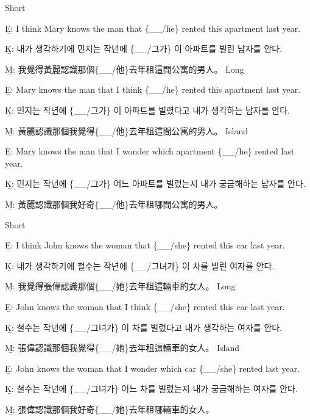 \pex %
\a Short\par\nobreak
\beginsubsub
\b{E:} I think Mary knows the man that \{\_\_/he\} rented this apartment last year.\par\nobreak
\b{K:} \ko 내가 생각하기에 민지는 작년에 \{\_\_/그가\} 이 아파트를 빌린 남자를 안다. \normalfont\par\nobreak
\b{M:} \zh 我覺得黃麗認識那個\{\_\_/他\}去年租這間公寓的男人。 \normalfont
\endsubsub
\a Long\par\nobreak
\beginsubsub
\b{E:} Mary knows the man that I think \{\_\_/he\} rented this apartment last year.\par\nobreak
\b{K:} \ko 민지는 작년에 \{\_\_/그가\} 이 아파트를 빌렸다고 내가 생각하는 남자를 안다. \normalfont\par\nobreak
\b{M:} \zh 黃麗認識那個我覺得\{\_\_/他\}去年租這間公寓的男人。 \normalfont
\endsubsub
\a Island\par\nobreak
\beginsubsub
\b{E:} Mary knows the man that I wonder which apartment \{\_\_/he\} rented last year.\par\nobreak
\b{K:} \ko 민지는 작년에 \{\_\_/그가\} 어느 아파트를 빌렸는지 내가 궁금해하는 남자를 안다\normalfont.\par\nobreak
\b{M:} \zh 黃麗認識那個我好奇\{\_\_/他\}去年租哪間公寓的男人。\normalfont
\endsubsub
\xe

\pex %
\a Short\par\nobreak
\beginsubsub
\b{E:} I think John knows the woman that \{\_\_/she\} rented this car last year.\par\nobreak
\b{K:} \ko 내가 생각하기에 철수는 작년에 \{\_\_/그녀가\} 이 차를 빌린 여자를 안다. \normalfont\par\nobreak
\b{M:} \zh 我覺得張偉認識那個\{\_\_/她\}去年租這輛車的女人。 \normalfont
\endsubsub
\a Long\par\nobreak
\beginsubsub
\b{E:} John knows the woman that I think \{\_\_/she\} rented this car last year.\par\nobreak
\b{K:} \ko 철수는 작년에 \{\_\_/그녀가\} 이 차를 빌렸다고 내가 생각하는 여자를 안다. \normalfont\par\nobreak
\b{M:} \zh 張偉認識那個我覺得\{\_\_/她\}去年租這輛車的女人。 \normalfont
\endsubsub
\a Island\par\nobreak
\beginsubsub
\b{E:} John knows the woman that I wonder which car \{\_\_/she\} rented last year.\par\nobreak
\b{K:} \ko 철수는 작년에 \{\_\_/그녀가\} 어느 차를 빌렸는지 내가 궁금해하는 여자를 안다\normalfont.\par\nobreak
\b{M:} \zh 張偉認識那個我好奇\{\_\_/她\}去年租哪輛車的女人。\normalfont
\endsubsub
\xe

